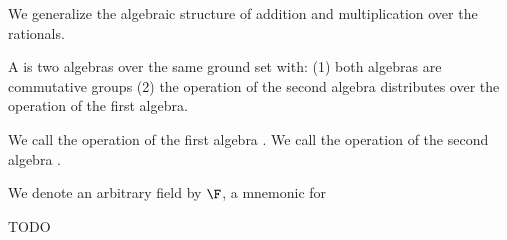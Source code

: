 

We generalize the algebraic structure of addition and multiplication over the rationals.


A  is two algebras over
the same ground set with:
(1) both algebras are commutative groups
(2) the operation of the second algebra
distributes over the operation of the first
algebra.

We call the operation of the first algebra
.
We call the operation of the second algebra
.


We denote an arbitrary field by $\F$, a mnemonic for 

TODO
